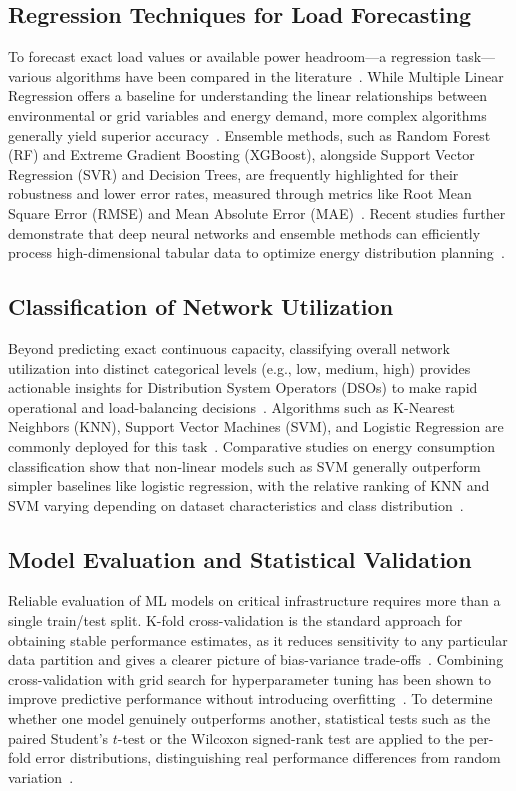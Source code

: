 \documentclass[conference]{IEEEtran}
\begin{document}
\subsection{Regression Techniques for Load Forecasting}

To forecast exact load values or available power headroom---a regression task---various algorithms have been compared in the literature~\cite{Elkari2023}. While Multiple Linear Regression offers a baseline for understanding the linear relationships between environmental or grid variables and energy demand, more complex algorithms generally yield superior accuracy~\cite{Ciulla2019}. Ensemble methods, such as Random Forest (RF) and Extreme Gradient Boosting (XGBoost), alongside Support Vector Regression (SVR) and Decision Trees, are frequently highlighted for their robustness and lower error rates, measured through metrics like Root Mean Square Error (RMSE) and Mean Absolute Error (MAE)~\cite{Chen2016,ElShahat2024}. Recent studies further demonstrate that deep neural networks and ensemble methods can efficiently process high-dimensional tabular data to optimize energy distribution planning~\cite{Badhon2024}.

\subsection{Classification of Network Utilization}

Beyond predicting exact continuous capacity, classifying overall network utilization into distinct categorical levels (e.g., low, medium, high) provides actionable insights for Distribution System Operators (DSOs) to make rapid operational and load-balancing decisions~\cite{Velasquez2011}. Algorithms such as K-Nearest Neighbors (KNN), Support Vector Machines (SVM), and Logistic Regression are commonly deployed for this task~\cite{MTR2022a}. Comparative studies on energy consumption classification show that non-linear models such as SVM generally outperform simpler baselines like logistic regression, with the relative ranking of KNN and SVM varying depending on dataset characteristics and class distribution~\cite{Ranjan2019,MTR2022a}.

\subsection{Model Evaluation and Statistical Validation}

Reliable evaluation of ML models on critical infrastructure requires more than a single train/test split. K-fold cross-validation is the standard approach for obtaining stable performance estimates, as it reduces sensitivity to any particular data partition and gives a clearer picture of bias-variance trade-offs~\cite{MTR2022b,Malakouti2023}. Combining cross-validation with grid search for hyperparameter tuning has been shown to improve predictive performance without introducing overfitting~\cite{Ranjan2019,Lim2022}. To determine whether one model genuinely outperforms another, statistical tests such as the paired Student's $t$-test or the Wilcoxon signed-rank test are applied to the per-fold error distributions, distinguishing real performance differences from random variation~\cite{Smucker2007,Hull1993}.
\end{document}
